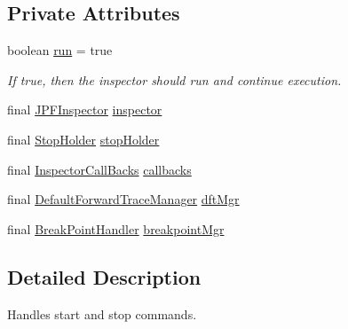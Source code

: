 \subsection*{Private Attributes}
\begin{DoxyCompactItemize}
\item 
boolean \hyperlink{classgov_1_1nasa_1_1jpf_1_1inspector_1_1server_1_1breakpoints_1_1_commands_manager_a1d783904757a3257347e483773ec629a}{run} = true
\begin{DoxyCompactList}\small\item\em If true, then the inspector should run and continue execution. \end{DoxyCompactList}\item 
final \hyperlink{classgov_1_1nasa_1_1jpf_1_1inspector_1_1server_1_1jpf_1_1_j_p_f_inspector}{J\+P\+F\+Inspector} \hyperlink{classgov_1_1nasa_1_1jpf_1_1inspector_1_1server_1_1breakpoints_1_1_commands_manager_a281675efc13e0f7e311b76bc7590a6ec}{inspector}
\item 
final \hyperlink{classgov_1_1nasa_1_1jpf_1_1inspector_1_1server_1_1jpf_1_1_stop_holder}{Stop\+Holder} \hyperlink{classgov_1_1nasa_1_1jpf_1_1inspector_1_1server_1_1breakpoints_1_1_commands_manager_a3573f950aba2548e59f2c4f7c193b307}{stop\+Holder}
\item 
final \hyperlink{interfacegov_1_1nasa_1_1jpf_1_1inspector_1_1interfaces_1_1_inspector_call_backs}{Inspector\+Call\+Backs} \hyperlink{classgov_1_1nasa_1_1jpf_1_1inspector_1_1server_1_1breakpoints_1_1_commands_manager_ab02c6f715b4d31eba248982ab95c61f3}{callbacks}
\item 
final \hyperlink{classgov_1_1nasa_1_1jpf_1_1inspector_1_1server_1_1breakpoints_1_1_default_forward_trace_manager}{Default\+Forward\+Trace\+Manager} \hyperlink{classgov_1_1nasa_1_1jpf_1_1inspector_1_1server_1_1breakpoints_1_1_commands_manager_a74b9803b08950f6fec6f004f5fe10308}{dft\+Mgr}
\item 
final \hyperlink{classgov_1_1nasa_1_1jpf_1_1inspector_1_1server_1_1breakpoints_1_1_break_point_handler}{Break\+Point\+Handler} \hyperlink{classgov_1_1nasa_1_1jpf_1_1inspector_1_1server_1_1breakpoints_1_1_commands_manager_abdc258b16cc838a9d7431d9ddd04e424}{breakpoint\+Mgr}
\end{DoxyCompactItemize}


\subsection{Detailed Description}
Handles start and stop commands. 

